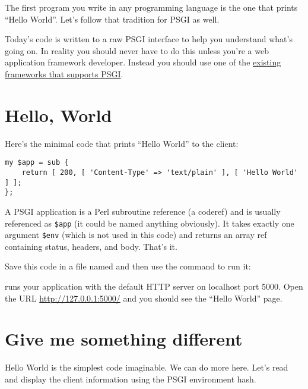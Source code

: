 The first program you write in any programming language is the one that
prints ``Hello World''. Let's follow that tradition for PSGI as well.

\begin{note}
  Today's code is written to a raw PSGI interface to help
you understand what's going on. In reality you should never have to do
this unless you're a web application framework developer. Instead you
should use one of the \href{http://plackperl.org/\#frameworks}{existing
frameworks that supports PSGI}.
\end{note}

\section{Hello, World}\label{hello-world}

Here's the minimal code that prints ``Hello World'' to the client:

\begin{lstlisting}
my $app = sub {
    return [ 200, [ 'Content-Type' => 'text/plain' ], [ 'Hello World' ] ];
};
\end{lstlisting}

A PSGI application is a Perl subroutine reference (a coderef) and is
usually referenced as \lstinline!$app! (it could be named anything
obviously). It takes exactly one argument \lstinline!$env! (which is not
used in this code) and returns an array ref containing status, headers,
and body. That's it.

Save this code in a file named  and then use the
 command to run it:


 runs your application with the default HTTP server
 on localhost port 5000. Open the URL
\url{http://127.0.0.1:5000/} and you should see the ``Hello World'' page.

\section{Give me something
different}\label{give-me-something-different}

Hello World is the simplest code imaginable. We can do more here. Let's
read and display the client information using the PSGI environment hash.

